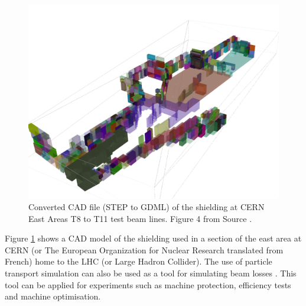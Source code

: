 \documentclass[12pt,a4paper]{article}
\begin{document}
\begin{figure}[h!]
\centering
\includegraphics[scale=0.13]{Images//introduction//CernEast.jpg}
\caption[width=\columnwidth]{Converted CAD file (STEP to GDML) of the shielding at CERN East Areas T8 to T11 test beam lines. Figure 4 from Source \cite{pyg4om}.}
\label{cerncad}
\end{figure}

\newpage
\noindent Figure \ref{cerncad} shows a CAD model of the shielding used in a section of the east area at CERN (or The European Organization for Nuclear Research translated from French) home to the LHC (or Large Hadron Collider). The use of particle transport simulation can also be used as a tool for simulating beam losses \cite{pyg4om}. This tool can be applied for experiments such as machine protection, efficiency tests and machine optimisation.
\\\\
\end{document}
